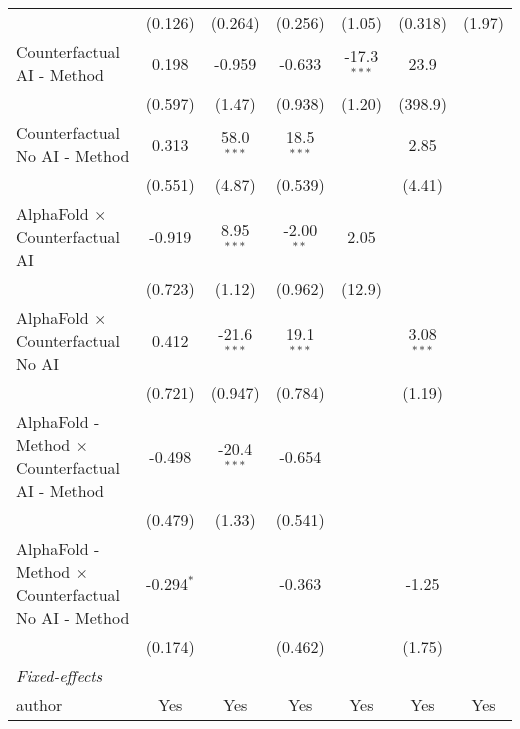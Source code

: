 \begin{tabular}{lcccccc}
                                                              & (0.126)      & (0.264)       & (0.256)      & (1.05)        & (0.318)      & (1.97)\\   
   Counterfactual AI - Method                                 & 0.198        & -0.959        & -0.633       & -17.3$^{***}$ & 23.9         &   \\   
                                                              & (0.597)      & (1.47)        & (0.938)      & (1.20)        & (398.9)      &   \\   
   Counterfactual No AI - Method                              & 0.313        & 58.0$^{***}$  & 18.5$^{***}$ &               & 2.85         &   \\   
                                                              & (0.551)      & (4.87)        & (0.539)      &               & (4.41)       &   \\   
   AlphaFold $\times$ Counterfactual AI                       & -0.919       & 8.95$^{***}$  & -2.00$^{**}$ & 2.05          &              &   \\   
                                                              & (0.723)      & (1.12)        & (0.962)      & (12.9)        &              &   \\   
   AlphaFold $\times$ Counterfactual No AI                    & 0.412        & -21.6$^{***}$ & 19.1$^{***}$ &               & 3.08$^{***}$ &   \\   
                                                              & (0.721)      & (0.947)       & (0.784)      &               & (1.19)       &   \\   
   AlphaFold - Method $\times$ Counterfactual AI - Method     & -0.498       & -20.4$^{***}$ & -0.654       &               &              &   \\   
                                                              & (0.479)      & (1.33)        & (0.541)      &               &              &   \\   
   AlphaFold - Method $\times$ Counterfactual No AI - Method  & -0.294$^{*}$ &               & -0.363       &               & -1.25        &   \\   
                                                              & (0.174)      &               & (0.462)      &               & (1.75)       &   \\   
   \midrule
   \emph{Fixed-effects}\\
   author                                                     & Yes          & Yes           & Yes          & Yes           & Yes          & Yes\\  

\end{tabular}
